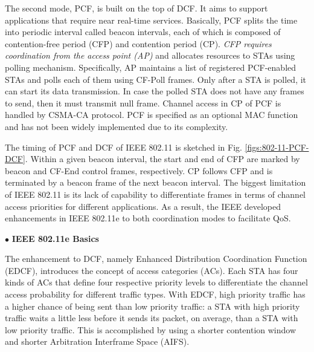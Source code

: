 \documentclass[12pt,onecolumn]{article}
\begin{document}
The second mode, PCF, is built on the top of DCF. It aims to support applications that require near real-time services. Basically, PCF splits the time into periodic interval called beacon intervals, each of which is composed of contention-free period (CFP) and contention period (CP). \textit{CFP requires coordination from the access point (AP)} and allocates resources to STAs using polling mechanism. Specifically, AP maintains a list of registered PCF-enabled STAs and polls each of them using CF-Poll frames. Only after a STA is polled, it can start its data transmission. In case the polled STA does not have any frames to send, then it must transmit null frame. Channel access in CP of PCF is handled by CSMA-CA protocol. PCF is specified as an optional MAC function and has not been widely implemented due to its complexity.

The timing of PCF and DCF of IEEE 802.11 is sketched in Fig. \ref{figs:802-11-PCF-DCF}. Within a given beacon interval, the start and end of CFP are marked by beacon and CF-End control frames, respectively. CP follows CFP and is terminated by a beacon frame of the next beacon interval. The biggest limitation of IEEE 802.11 is its lack of capability to differentiate frames in terms of channel access priorities for different applications. As a result, the IEEE developed enhancements in IEEE 802.11e to both coordination modes to facilitate QoS.

\vspace{3mm}
\noindent $\bullet$ \textbf{IEEE 802.11e Basics}
\vspace{3mm}

\noindent The enhancement to DCF, namely Enhanced Distribution Coordination Function (EDCF), introduces the concept of
access categories (ACs). Each STA has four kinds of ACs that define four respective priority levels to differentiate the channel access probability for different traffic types. With EDCF, high priority traffic has a higher chance of being sent than low priority traffic: a STA with high priority traffic waits a little less before it sends its packet, on average, than a STA with low priority traffic. This is accomplished by using a shorter contention window and shorter Arbitration Interframe Space (AIFS).
\end{document}
